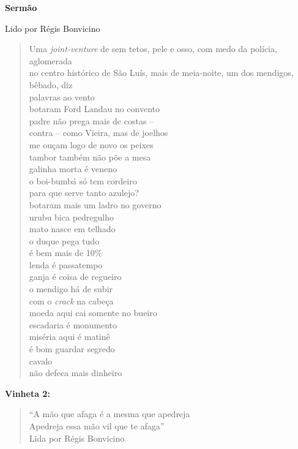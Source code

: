 \pagebreak

\textbf{Sermão}

Lido por Régis Bonvicino

\begin{verse}
Uma \emph{joint-venture} de sem tetos, pele e osso, com medo da polícia, \qb{}aglomerada\\
no centro histórico de São Luís, mais de meia-noite, um dos mendigos, \qb{}bêbado, diz\\[15pt]
palavras ao vento\\
botaram Ford Landau no convento\\
padre não prega mais de costas --\\
contra -- como Vieira, mas de joelhos\\[5pt]
me ouçam logo de novo os peixes\\
tambor também não põe a mesa\\
galinha morta é veneno\\
o boi-bumbá só tem cordeiro\\[5pt]
para que serve tanto azulejo?\\
botaram mais um ladro no governo\\
urubu bica pedregulho\\
mato nasce em telhado\\[5pt]
o duque pega tudo\\
é bem mais de 10\%\\
lenda é passatempo\\
ganja é coisa de regueiro\\[5pt]
o mendigo há de subir\\
com o \emph{crack} na cabeça\\
moeda aqui cai somente no bueiro\\
escadaria é monumento\\[5pt]
miséria aqui é matinê\\
é bom guardar segredo\\
cavalo\\
não defeca mais dinheiro
\end{verse}

\pagebreak

\textbf{Vinheta 2:}


\begin{verse}
``A mão que afaga é a mesma que apedreja\\
Apedreja essa mão vil que te afaga''\\[5pt]
Lida por Régis Bonvicino
\end{verse}

